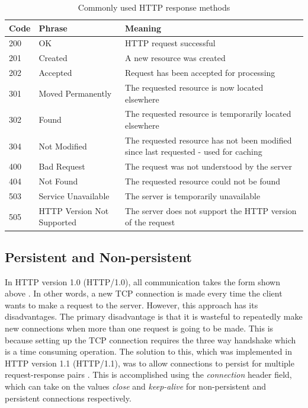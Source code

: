 \documentclass[10pt,twocolumn]{witseiepaper}
\begin{document}
	\begin{table}[tb]
		\centering
		\caption{Commonly used HTTP response methods}
		\label{httpresps}
		\begin{tabular}{p{}|p{}|p{}}
			\hline
			\textbf{Code} & \textbf{Phrase} & \textbf{Meaning} \\ \hline
			200 & OK & HTTP request successful \\
			201 & Created & A new resource was created \\
			202 & Accepted & Request has been accepted for processing \\
			301 & Moved Permanently & The requested resource is now located elsewhere \\
			302 & Found & The requested resource is temporarily located elsewhere \\
			304 & Not Modified & The requested resource has not been modified since last requested - used for caching \\
			400 & Bad Request & The request was not understood by the server \\
			404 & Not Found & The requested resource could not be found \\
			503 & Service Unavailable & The server is temporarily unavailable \\
			505 & HTTP Version Not Supported & The server does not support the HTTP version of the request \\
			\hline
		\end{tabular}
	\end{table}

	\subsection{Persistent and Non-persistent} \label{pvnp}

	In HTTP version 1.0 (HTTP/1.0), all communication takes the form shown above \cite{rfc1945}. In other words, a new TCP connection is made every time the client wants to make a request to the server. However, this approach has its disadvantages. The primary disadvantage is that it is wasteful to repeatedly make new connections when more than one request is going to be made. This is because setting up the TCP connection requires the three way handshake which is a time consuming operation. The solution to this, which was implemented in HTTP version 1.1 (HTTP/1.1), was to allow connections to persist for multiple request-response pairs \cite{rfc7230}. This is accomplished using the \emph{connection} header field, which can take on the values \emph{close} and \emph{keep-alive} for non-persistent and persistent connections respectively.
\end{document}
